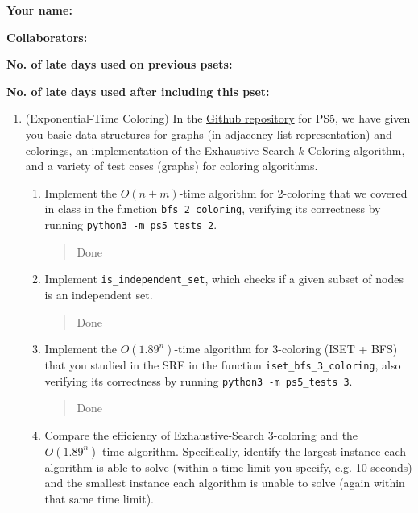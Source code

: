 \documentclass[11pt]{article}
\begin{document}

\textbf{Your name: }

\textbf{Collaborators: }

\textbf{No. of late days used on previous psets: }

\textbf{No. of late days used after including this pset: }

\begin{enumerate}
 
 \item (Exponential-Time Coloring) 
  In the \href{https://github.com/Harvard-CS-120/cs120/tree/main/fall2023/psets}{Github repository} for PS5, we have given you basic data structures for graphs (in adjacency list representation) and colorings, an implementation of the Exhaustive-Search $k$-Coloring algorithm, and a variety of test cases (graphs) for coloring algorithms.

  \begin{enumerate}
      \item Implement the $O(n+m)$-time algorithm for 2-coloring that we covered in class in the function \texttt{bfs\_2\_coloring}, verifying its correctness by running \texttt{python3 -m ps5\_tests 2}.
      \begin{quote}
          \color{purple}
          Done
      \end{quote}
      
      \item Implement \texttt{is\_independent\_set}, which checks if a given subset of nodes is an independent set.
      \begin{quote}
          \color{purple}
          Done
      \end{quote}
      
      \item Implement the $O(1.89^n)$-time algorithm for 3-coloring (ISET + BFS) that you studied in the SRE in the function \texttt{iset\_bfs\_3\_coloring}, also verifying its correctness by running \texttt{python3 -m ps5\_tests 3}. \label{part:TbT}
      \begin{quote}
          \color{purple}
          Done
      \end{quote}
    
    \item Compare the efficiency of Exhaustive-Search 3-coloring and the $O(1.89^n)$-time algorithm. Specifically, identify the largest instance each algorithm is able to solve (within a time limit you specify, e.g. 10 seconds) and the smallest instance each algorithm is unable to solve (again within that same time limit). \\
    

\end{enumerate}
\end{enumerate}
\end{document}
